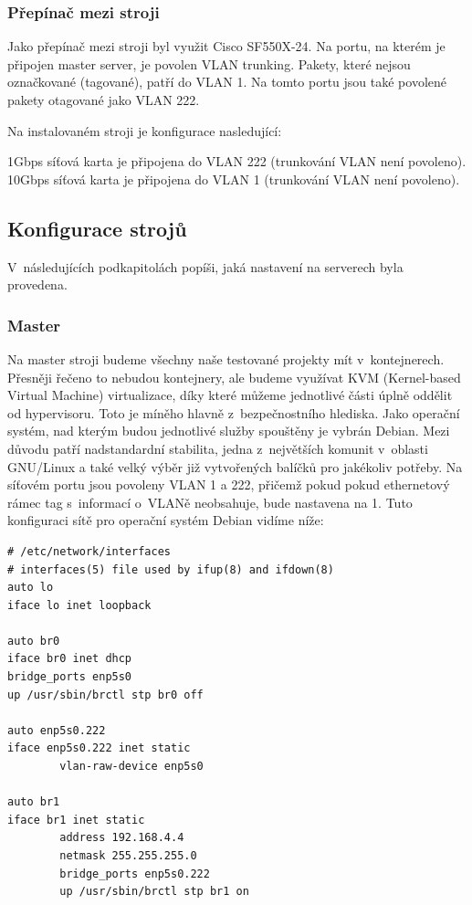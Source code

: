 \subsubsection{Přepínač mezi stroji}

Jako přepínač mezi stroji byl využit Cisco SF550X-24. Na portu, na kterém je připojen master server, je povolen VLAN trunking. Pakety, které nejsou označkované (tagované), patří do VLAN 1. Na tomto portu jsou také povolené pakety otagované jako VLAN 222.

Na instalovaném stroji je konfigurace nasledující:

1Gbps síťová karta je připojena do VLAN 222 (trunkování VLAN není povoleno).
10Gbps síťová karta je připojena do VLAN 1 (trunkování VLAN není povoleno).

\subsection{Konfigurace strojů}

V~následujících podkapitolách popíši, jaká nastavení na serverech byla provedena.
\subsubsection{Master}

Na master stroji budeme všechny naše testované projekty mít v~kontejnerech. Přesněji řečeno to nebudou kontejnery, ale budeme využívat KVM (Kernel-based Virtual Machine) virtualizace, díky které můžeme jednotlivé části úplně oddělit od hypervisoru. Toto je míněho hlavně z~bezpečnostního hlediska. Jako operační systém, nad kterým budou jednotlivé služby spouštěny je vybrán Debian. Mezi důvodu patří nadstandardní stabilita, jedna z~největších komunit v~oblasti GNU/Linux a také velký výběr již vytvořených balíčků pro jakékoliv potřeby. Na síťovém portu jsou povoleny VLAN 1 a 222, přičemž pokud pokud ethernetový rámec tag s~informací o~VLANě neobsahuje, bude nastavena na 1. Tuto konfiguraci sítě pro operační systém Debian vidíme níže:

\begin{verbatim}
# /etc/network/interfaces
# interfaces(5) file used by ifup(8) and ifdown(8)
auto lo
iface lo inet loopback

auto br0
iface br0 inet dhcp
bridge_ports enp5s0
up /usr/sbin/brctl stp br0 off

auto enp5s0.222
iface enp5s0.222 inet static
        vlan-raw-device enp5s0

auto br1
iface br1 inet static
        address 192.168.4.4
        netmask 255.255.255.0
        bridge_ports enp5s0.222
        up /usr/sbin/brctl stp br1 on
\end{verbatim}

